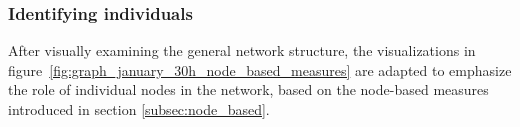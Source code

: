 \subsubsection{Identifying individuals}
\label{subsubsec:vis_individuals}    

After visually examining the general network structure, the visualizations in figure~\ref{fig:graph_january_30h_node_based_measures} are adapted to emphasize the role of individual nodes in the network, based on the node-based measures introduced in section \ref{subsec:node_based}.  

\begin{figure}[htpb]%
	\centering 
				
\end{figure}
